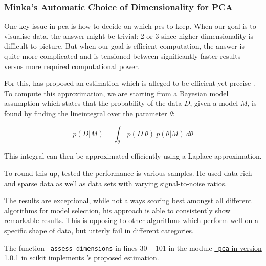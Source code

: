 \clearpage


\subsubsection{Minka's Automatic Choice of Dimensionality for PCA} \label{sec:mle}

One key issue in \acrlong{pca} is how to decide on which \glspl{pc} to keep.
When our goal is to visualise data, the answer might be trivial: 2 or 3 since higher dimensionality is difficult to picture.
But when our goal is efficient computation, the answer is quite more complicated and is tensioned between significantly faster results versus more required computational power.
\bigskip


For this, \citeauthor{minka2000automatic} has proposed an estimation which is alleged to be efficient yet precise \cite{minka2000automatic}.
To compute this approximation, we are starting from a Bayesian model assumption which states that the probability of the data $D$, given a model $M$, is found by finding the \gls{lineintegral} over the parameter $\theta$:

\begin{equation}
	\label{formula:minkaMLE}
	p(D | M) = \int_\theta \ p(D | \theta)\ p(\theta | M)\ d\theta
\end{equation}

\medskip\noindent
This integral can then be approximated efficiently using a Laplace approximation.
\bigskip

To round this up, \citeauthor{minka2000automatic} tested the performance is various samples.
He used data-rich and sparse data as well as data sets with varying signal-to-noise ratios.

The results are exceptional, while not always scoring best amongst all different algorithms for model selection, his approach is able to consistently show remarkable results.
This is opposing to other algorithms which perform well on a specific shape of data, but utterly fail in different categories.



\bigskip
The function \texttt{\_assess\_dimensions} in lines 30 -- 101 in the module \href{\scikitPCAvIxOxI{_pca}}{\texttt{\_pca} in version 1.0.1} in \gls{scikit} implements \citeauthor{minka2000automatic}'s proposed estimation.



